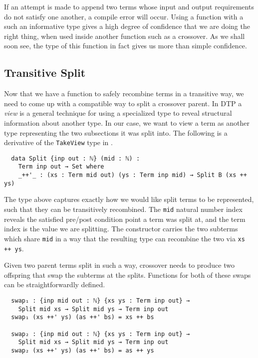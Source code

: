 \documentclass[runningheads,a4paper]{llncs}
\begin{document}
If an attempt is made to append two terms whose input and output
requirements do not satisfy one another, a compile error will
occur. Using a function with a such an informative type gives a high
degree of confidence that we are doing the right thing, when used
inside another function such as a crossover. As we shall soon
see, the type of this function in fact gives us more than simple confidence.

\subsection{Transitive Split}

Now that we have a function to safely recombine terms in a transitive
way, we need to come up with a compatible way to split a crossover
parent. In DTP a \textit{view} \cite{mcbride:viewleft} is a general technique for using a
specialized type to reveal structural information about another type. In our case,
we want to view a term as another type representing the two
subsections it was split into. The following is a derivative of the
\texttt{TakeView} type in \cite{oury:tpop}.

\begin{verbatim}
  data Split {inp out : ℕ} (mid : ℕ) :
    Term inp out → Set where
    _++'_ : (xs : Term mid out) (ys : Term inp mid) → Split B (xs ++ ys)
\end{verbatim}

The type above captures exactly how we would like split terms to be
represented, such that they can be transitively recombined. The
\texttt{mid} natural number index reveals the satisfied
pre/post condition point a term was split at, and the term index is the
value we are splitting. The constructor carries the two
subterms which share \texttt{mid} in a way that the resulting type can
recombine the two via \texttt{xs ++ ys}.

Given two parent terms split in such a way, crossover needs to produce
two offspring that swap the subterms at the splits. Functions for both
of these swaps can be straightforwardly defined.

\begin{verbatim}
  swap₁ : {inp mid out : ℕ} {xs ys : Term inp out} →
    Split mid xs → Split mid ys → Term inp out
  swap₁ (xs ++' ys) (as ++' bs) = xs ++ bs

  swap₂ : {inp mid out : ℕ} {xs ys : Term inp out} →
    Split mid xs → Split mid ys → Term inp out
  swap₂ (xs ++' ys) (as ++' bs) = as ++ ys
\end{verbatim}
\end{document}
